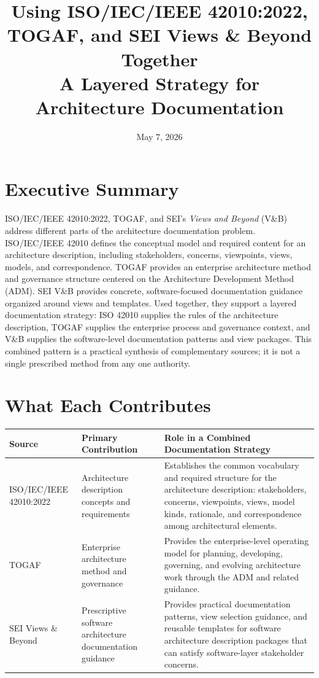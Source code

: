 \documentclass[11pt]{article}
\title{Using ISO/IEC/IEEE 42010:2022, TOGAF, and SEI Views \& Beyond Together\\\large A Layered Strategy for Architecture Documentation}
\author{}
\date{May 7, 2026}
\begin{document}
\maketitle
\thispagestyle{empty}

\section*{Executive Summary}
ISO/IEC/IEEE 42010:2022, TOGAF, and SEI's \emph{Views and Beyond} (V\&B) address different parts of the architecture documentation problem. ISO/IEC/IEEE 42010 defines the conceptual model and required content for an architecture description, including stakeholders, concerns, viewpoints, views, models, and correspondence. TOGAF provides an enterprise architecture method and governance structure centered on the Architecture Development Method (ADM). SEI V\&B provides concrete, software-focused documentation guidance organized around views and templates. Used together, they support a layered documentation strategy: ISO 42010 supplies the rules of the architecture description, TOGAF supplies the enterprise process and governance context, and V\&B supplies the software-level documentation patterns and view packages. This combined pattern is a practical synthesis of complementary sources; it is not a single prescribed method from any one authority.\cite{iso42010cm,iso42010ads,togafstd,sei_vb_factsheet,sei_vb_book}

\section*{What Each Contributes}
\begin{table}[h!]
\small
\centering
\begin{tabularx}{\textwidth}{>{\raggedright\arraybackslash}p{} >{\raggedright\arraybackslash}p{} X}
\toprule
\textbf{Source} & \textbf{Primary Contribution} & \textbf{Role in a Combined Documentation Strategy} \\
\midrule
ISO/IEC/IEEE 42010:2022 & Architecture description concepts and requirements & Establishes the common vocabulary and required structure for the architecture description: stakeholders, concerns, viewpoints, views, model kinds, rationale, and correspondence among architectural elements.\cite{iso42010cm,iso42010ads,iso42010gettingstarted} \\
\addlinespace
TOGAF & Enterprise architecture method and governance & Provides the enterprise-level operating model for planning, developing, governing, and evolving architecture work through the ADM and related guidance.\cite{togafstd,togafadm,togafdownloads} \\
\addlinespace
SEI Views \& Beyond & Prescriptive software architecture documentation guidance & Provides practical documentation patterns, view selection guidance, and reusable templates for software architecture description packages that can satisfy software-layer stakeholder concerns.\cite{sei_vb_factsheet,sei_vb_book} \\
\bottomrule
\end{tabularx}
\end{table}
\end{document}
